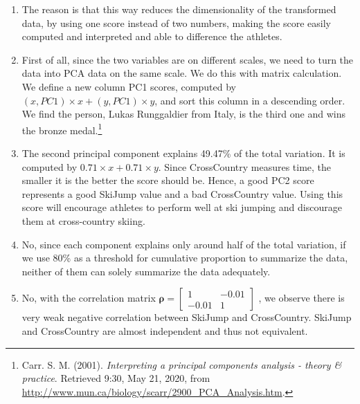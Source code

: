 \documentclass[10pt]{article}
\begin{document}
\begin{enumerate}[1)]
\item
The reason is that this way reduces the dimensionality of the transformed data, by using one score instead of two numbers, making the score easily computed and interpreted and able to difference the athletes.

\item
First of all, since the two variables are on different scales, we need to turn the data into PCA data on the same scale. We do this with matrix calculation.\\
We define a new column {\ttfamily PC1 scores}, computed by $(x,PC1)\times x+(y,PC1)\times y$, and sort this column in a descending order. We find the person, Lukas Runggaldier from Italy, is the third one and wins the bronze medal.\footnote{\;Carr. S. M. (2001). \textit{Interpreting a principal components analysis - theory \& practice}. Retrieved 9:30, May 21, 2020, from \url{http://www.mun.ca/biology/scarr/2900_PCA_Analysis.htm}.}

\item
The second principal component explains 49.47\% of the total variation. It is computed by $0.71\times x+0.71\times y$. Since {\ttfamily CrossCountry} measures time, the smaller it is the better the score should be. Hence, a good PC2 score represents a good {\ttfamily SkiJump} value and a bad {\ttfamily CrossCountry} value. Using this score will encourage athletes to perform well at ski jumping and discourage them at cross-country skiing.

\item
No, since each component explains only around half of the total variation, if we use 80\% as a threshold for cumulative proportion to summarize the data, neither of them can solely summarize the data adequately.

\item
No, with the correlation matrix $\pmb{\rho}=
  \begin{bmatrix}
    1 & -0.01\\
    -0.01 & 1
  \end{bmatrix}$
, we observe there is very weak negative correlation between {\ttfamily SkiJump} and {\ttfamily CrossCountry}. {\ttfamily SkiJump} and {\ttfamily CrossCountry} are almost independent and thus not equivalent.


\end{enumerate}
\end{document}
